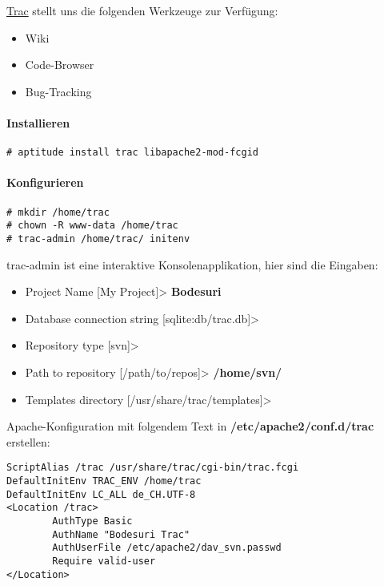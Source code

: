 \documentclass[a4paper,12pt,halfparskip,DIV14]{scrreprt}
\begin{document}
\href{http://trac.edgewall.org/}{Trac} stellt uns die folgenden Werkzeuge zur Verfügung:

\begin{itemize}
	\item Wiki
	\item Code-Browser
	\item Bug-Tracking
\end{itemize}

\paragraph{Installieren}

\begin{verbatim}
# aptitude install trac libapache2-mod-fcgid
\end{verbatim}

\paragraph{Konfigurieren}

\begin{verbatim}
# mkdir /home/trac
# chown -R www-data /home/trac
# trac-admin /home/trac/ initenv
\end{verbatim}

trac-admin ist eine interaktive Konsolenapplikation, hier sind die Eingaben:

\begin{itemize}
	\item Project Name [My Project]> \textbf{Bodesuri}
	\item Database connection string [sqlite:db/trac.db]>
	\item Repository type [svn]>
	\item Path to repository [/path/to/repos]> \textbf{/home/svn/}
	\item Templates directory [/usr/share/trac/templates]>
\end{itemize}

Apache-Konfiguration mit folgendem Text in \textbf{/etc/apache2/conf.d/trac} erstellen:

\begin{verbatim}
ScriptAlias /trac /usr/share/trac/cgi-bin/trac.fcgi
DefaultInitEnv TRAC_ENV /home/trac
DefaultInitEnv LC_ALL de_CH.UTF-8
<Location /trac>
        AuthType Basic
        AuthName "Bodesuri Trac"
        AuthUserFile /etc/apache2/dav_svn.passwd
        Require valid-user
</Location>
\end{verbatim}
\end{document}
